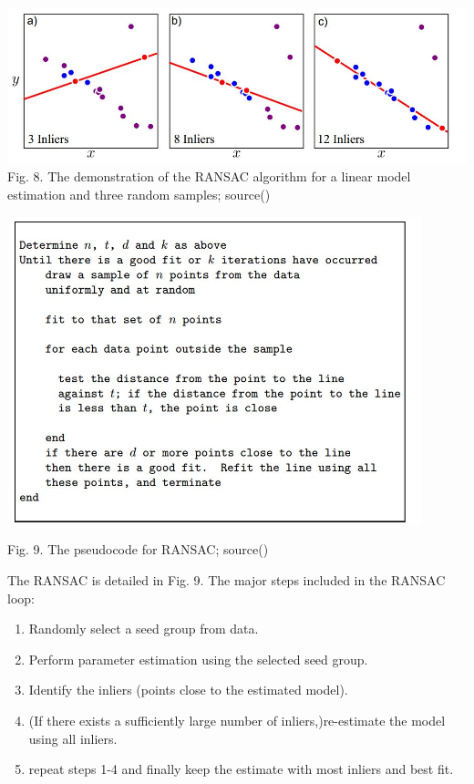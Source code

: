 \documentclass{article}
\begin{document}
\includegraphics[width=\textwidth]{ransac2.png}
Fig. 8. The demonstration of the RANSAC algorithm for a linear model estimation and three random samples; source(\cite{prince2012computer})


\includegraphics[width=0.9\textwidth]{ransac3.png}

Fig. 9. The pseudocode for RANSAC; source(\cite{forsyth2011computer})

The RANSAC is detailed in Fig. 9. The major steps included in the RANSAC loop:

\begin{enumerate}
  \item Randomly select a seed group from data.
  \item Perform parameter estimation using the selected seed group.
  \item Identify the inliers (points close to the estimated model).
  \item (If there exists a sufficiently large number of inliers,)re-estimate the model using all inliers.
  \item repeat steps 1-4 and finally keep the estimate with most inliers and best fit.
\end{enumerate}
\end{document}
